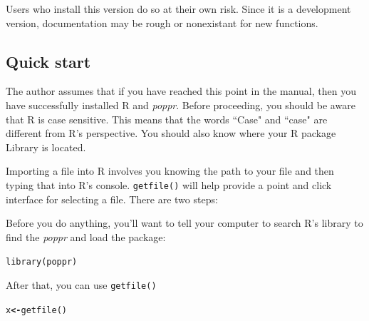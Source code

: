 \documentclass[letterpaper]{article}\usepackage[]{graphicx}\usepackage[]{color}
\makeatletter
\newcommand{\hlstd}[1]{\textcolor[rgb]{0,0,0}{#1}}%
\newcommand{\hlkwb}[1]{\textcolor[rgb]{0.502,0.502,0.753}{\textbf{#1}}}%
\newcommand{\hlkwd}[1]{\textcolor[rgb]{0,0.267,0.4}{#1}}%
\newenvironment{kframe}{%
 \def\at@end@of@kframe{}%
 \ifinner\ifhmode%
  \def\at@end@of@kframe{\end{minipage}}%
  \begin{minipage}{\columnwidth}%
 \fi\fi%
 \def\FrameCommand##1{\hskip\@totalleftmargin \hskip-\fboxsep
 \colorbox{shadecolor}{##1}\hskip-\fboxsep
     \hskip-\linewidth \hskip-\@totalleftmargin \hskip\columnwidth}%
 \MakeFramed {\advance\hsize-\width
   \@totalleftmargin\z@ \linewidth\hsize
   \@setminipage}}%
 {\par\unskip\endMakeFramed%
 \at@end@of@kframe}
\newenvironment{knitrout}{}{} %
\newcommand{\tab}{\hspace*{1em}}
\makeatother
\begin{document}
Users who install this version do so at their own risk. Since it is a development version, documentation may be rough or nonexistant for new functions. 

\subsection{Quick start}\label{intro:qstart}

\tab\tab The author assumes that if you have reached this point in the manual, then you have successfully installed R and \textit{poppr}. Before proceeding, you should be aware that R is case sensitive. This means that the words ``Case" and ``case" are different from R's perspective. You should also know where your R package Library is located.
\begin{center}
\end{center}
Importing a file into R involves you knowing the path to your file and then typing that into R's console. \texttt{getfile()} will help provide a point and click interface for selecting a file. There are two steps:


Before you do anything, you'll want to tell your computer to search R's library to find the \textit{poppr} and load the package:
\begin{knitrout}\footnotesize
{}\color{fgcolor}\begin{kframe}
\begin{alltt}
\hlkwd{library}\hlstd{(poppr)}
\end{alltt}
\end{kframe}
\end{knitrout}

After that, you can use \texttt{getfile()}
\begin{knitrout}\footnotesize
{}\color{fgcolor}\begin{kframe}
\begin{alltt}
\hlstd{x} \hlkwb{<-} \hlkwd{getfile}\hlstd{()}
\end{alltt}
\end{kframe}
\end{knitrout}
\end{document}
